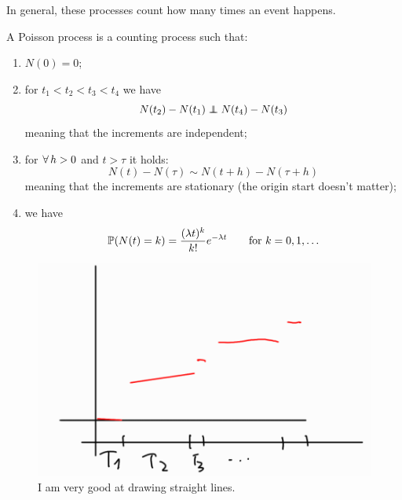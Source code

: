 \documentclass[12pt]{report}
\begin{document}
	In general, these processes count how many times an event happens.
	\begin{definition}
		A Poisson process is a counting process such that:
		\begin{enumerate}
			\item $N(0)=0$;
			\item for $t_1<t_2<t_3<t_4$ we have
			\begin{equation*}
				N(t_2)-N(t_1)\independent N(t_4)-N(t_3)
			\end{equation*}
			meaning that the increments are independent;
			\item for $\forall\, h>0$ and $t>\tau$ it holds:
			\begin{equation*}
				N(t)-N(\tau)\sim N(t+h)-N(\tau+h)
			\end{equation*}
			meaning that the increments are stationary (the origin start doesn't matter);
			\item we have $$\mathbb{P}(N(t)=k)=\frac{(\lambda t)^{k}}{k!}e^{-\lambda t}\qquad\text{for } k=0,1,\ldots$$
		\end{enumerate}
	\end{definition}
	\begin{figure}[h]
		\centering
		\includegraphics[width=0.7\linewidth]{img/screenshot002}
		\caption{I am very good at drawing straight lines.}
		\label{fig:screenshot002}
	\end{figure}
	
\end{document}
